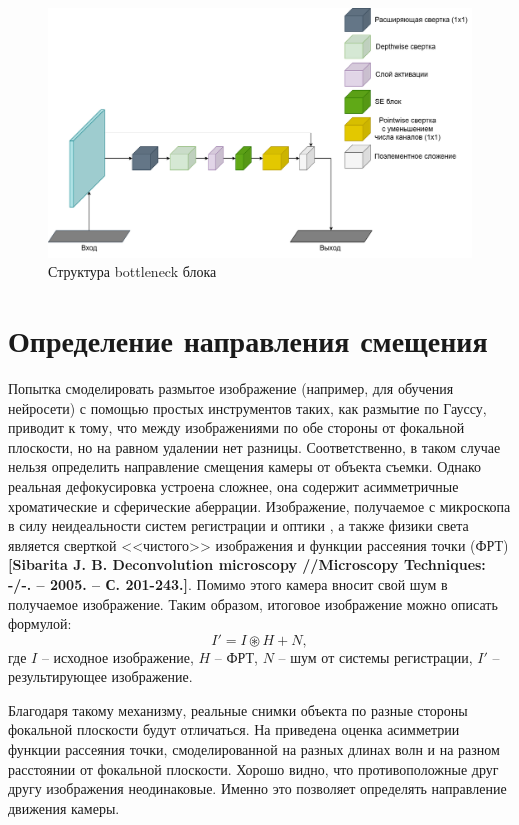 \begin{figure}[ht] 
	\center
	\includegraphics [scale=0.4] {my_folder/images/FocusNet-Bottleneck.png}
	\caption{Структура bottleneck блока}
	\label{fig:FocusNet-Bottleneck}
\end{figure}

\section{Определение направления смещения}
Попытка смоделировать размытое изображение (например, для обучения нейросети) с помощью простых инструментов таких, как размытие по Гауссу, приводит к тому, что между изображениями по обе стороны от фокальной плоскости, но на равном удалении нет разницы. Соответственно, в таком случае нельзя определить направление смещения камеры от объекта съемки. Однако реальная дефокусировка устроена сложнее, она содержит асимметричные хроматические и сферические аберрации. Изображение, получаемое с микроскопа в силу неидеальности систем регистрации и оптики , а также физики света является сверткой <<чистого>> изображения и функции рассеяния точки (ФРТ) \textbf{[Sibarita J. B. Deconvolution microscopy //Microscopy Techniques: -/-. – 2005. – С. 201-243.]}. Помимо этого камера вносит свой шум в получаемое изображение. Таким образом, итоговое изображение можно описать формулой:
\begin{equation}
	I'=I \circledast H + N,
	\label{eq:res_img_with_PSF}
\end{equation}
где $I$ -- исходное изображение, $H$ -- ФРТ, $N$ -- шум от системы регистрации, $I'$ -- результирующее изображение.

Благодаря такому механизму, реальные снимки объекта по разные стороны фокальной плоскости будут отличаться. На  приведена оценка  асимметрии функции рассеяния точки, смоделированной на разных длинах волн и на разном расстоянии от фокальной плоскости. Хорошо видно, что противоположные друг другу изображения неодинаковые. Именно это позволяет определять направление движения камеры.

